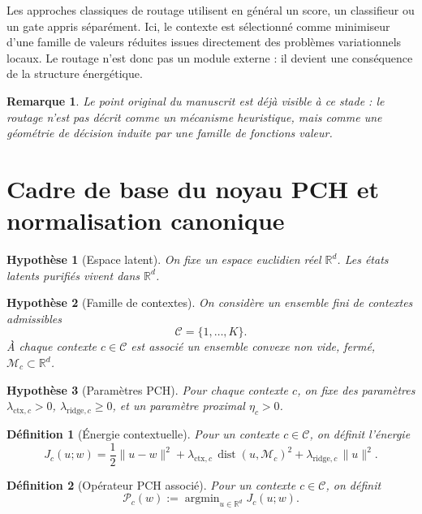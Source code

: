 \documentclass[11pt,a4paper]{article}
\newtheorem{definition}{Définition}[section]
\newtheorem{assumption}{Hypothèse}[section]
\newtheorem{remark}{Remarque}[section]
\DeclareMathOperator{\argmin}{argmin}
\DeclareMathOperator{\dist}{dist}
\newcommand{\R}{\mathbb R}
\newcommand{\Mcal}{\mathcal M}
\newcommand{\Ccal}{\mathcal C}
\newcommand{\Pcal}{\mathcal P}
\begin{document}
Les approches classiques de routage utilisent en général un score, un classifieur ou un gate appris séparément. Ici, le contexte est sélectionné comme minimiseur d'une famille de valeurs réduites issues directement des problèmes variationnels locaux. Le routage n'est donc pas un module externe : il devient une conséquence de la structure énergétique.

\begin{remark}
Le point original du manuscrit est déjà visible à ce stade : le routage n'est pas décrit comme un mécanisme heuristique, mais comme une géométrie de décision induite par une famille de fonctions valeur.
\end{remark}

\section{Cadre de base du noyau PCH et normalisation canonique}

\begin{assumption}[Espace latent]
On fixe un espace euclidien réel \(\R^d\). Les états latents purifiés vivent dans \(\R^d\).
\end{assumption}

\begin{assumption}[Famille de contextes]
On considère un ensemble fini de contextes admissibles
\[
\Ccal = \{1,\dots,K\}.
\]
À chaque contexte \(c\in\Ccal\) est associé un ensemble convexe non vide, fermé, \(\Mcal_c\subset\R^d\).
\end{assumption}

\begin{assumption}[Paramètres PCH]
Pour chaque contexte \(c\), on fixe des paramètres \(\lambda_{\mathrm{ctx},c}>0\), \(\lambda_{\mathrm{ridge},c}\ge 0\), et un paramètre proximal \(\eta_c>0\).
\end{assumption}

\begin{definition}[Énergie contextuelle]
Pour un contexte \(c\in\Ccal\), on définit l'énergie
\[
J_c(u;w)
=
\frac12\|u-w\|^2
+
\lambda_{\mathrm{ctx},c}\,\dist(u,\Mcal_c)^2
+
\lambda_{\mathrm{ridge},c}\,\|u\|^2.
\]
\end{definition}

\begin{definition}[Opérateur PCH associé]
Pour un contexte \(c\in\Ccal\), on définit
\[
\Pcal_c(w)
:=
\argmin_{u\in\R^d} J_c(u;w).
\]
\end{definition}
\end{document}
